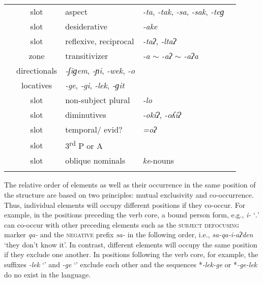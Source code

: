 \documentclass[output=paper]{langscibook}
\begin{document}
\begin{table}
\begin{tabular}{Sclll}
\label{moc:asp}               & slot          & aspect             & \textit{-ta}, \textit{-tak}, \textit{-sa}, \textit{-sak}, \textit{-teɡ}        \\
\label{des}               & slot          &  desiderative & \textit{-ake} \\ 
\label{rr}             & slot          & reflexive, reciprocal    & \textit{-taʔ}, \textit{-ltaʔ}          \\
           & {zone}       &  transitivizer & \textit{-a} $\sim$ \textit{-aʔ} $\sim$ \textit{-aʔa}\\
& {directionals} & \textit{-ʃiɡem}, \textit{-ɲi}, \textit{-wek}, \textit{-o}\\
& {locatives} & \textit{-ge}, \textit{-gi}, \textit{-lek}, \textit{-ɡit}  \\
\label{pllo}             & slot          & non-subject plural    & \textit{-lo}    \\
\label{moc:dim}             & slot          & diminutives    & \textit{-okiʔ}, \textit{-oʎiʔ}    \\
\label{encl}             & slot          & temporal/ evid?    & \textit{=oʔ}     \\
\label{moc:parg}             & slot          & 3\textsuperscript{rd} P or A  &        \\
\label{moc:obl}             & slot          &  oblique nominals     & \textit{ke}-nouns      \\

\lspbottomrule
\end{tabular}
\end{table}

The relative order of elements as well as their occurrence in the same position of the structure are based on two principles: mutual exclusivity and co-occurrence. Thus, individual elements will occupy different positions if they co-occur. For example, in the positions preceding the verb core, a bound person form, e.g., \textit{i-} `\textsc{\Third.\II}' can co-occur with other preceding elements such as the \textsc{subject defocusing} marker \textit{qa-} and the \textsc{negative} prefix \textit{sa-} in the following order, i.e., \textit{sa-qa-i-aʔden} `they don't know it'. In contrast, different elements will occupy the same position if they exclude one another. In positions following the verb core, for example, the suffixes \textit{-lek} `\LocOne' and \textit{-ge} `\LocTwo' exclude each other and the sequences *\textit{-lek-ge} or *\textit{-ge-lek} do no exist in the language.
\end{document}
